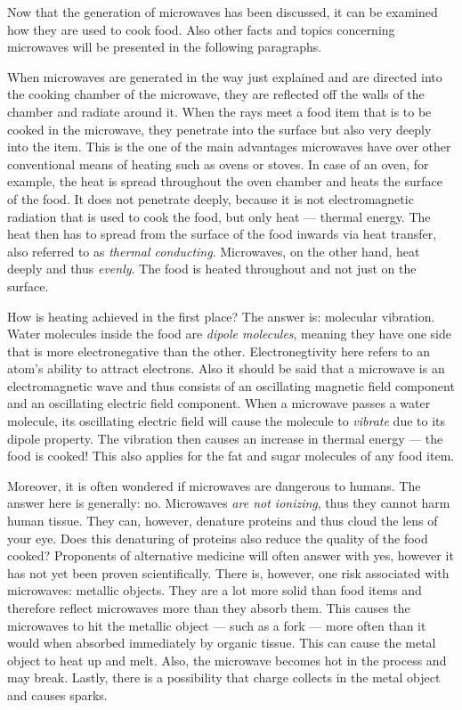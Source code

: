 
Now that the generation of microwaves has been discussed, it can be examined how they are used to cook food. Also other facts and topics concerning microwaves will be presented in the following paragraphs.

When microwaves are generated in the way just explained and are directed into the cooking chamber of the microwave, they are reflected off the walls of the chamber and radiate around it. When the rays meet a food item that is to be cooked in the microwave, they penetrate into the surface but also very deeply into the item. This is the one of the main advantages microwaves have over other conventional means of heating such as ovens or stoves. In case of an oven, for example, the heat is spread throughout the oven chamber and heats the surface of the food. It does not penetrate deeply, because it is not electromagnetic radiation that is used to cook the food, but only heat --- thermal energy. The heat then has to spread from the surface of the food inwards via heat transfer, also referred to as \emph{thermal conducting}. Microwaves, on the other hand, heat deeply and thus \emph{evenly}. The food is heated throughout and not just on the surface. 

How is heating achieved in the first place? The answer is: molecular vibration. Water molecules inside the food are \emph{dipole molecules}, meaning they have one side that is more electronegative than the other. Electronegtivity here refers to an atom's ability to attract electrons. Also it should be said that a microwave is an electromagnetic wave and thus consists of an oscillating magnetic field component and an oscillating electric field component. When a microwave passes a water molecule, its oscillating electric field will cause the molecule to \emph{vibrate} due to its dipole property. The vibration then causes an increase in thermal energy --- the food is cooked! This also applies for the fat and sugar molecules of any food item.

Moreover, it is often wondered if microwaves are dangerous to humans. The answer here is generally: no. Microwaves \emph{are not ionizing}, thus they cannot harm human tissue. They can, however, denature proteins and thus cloud the lens of your eye. Does this denaturing of proteins also reduce the quality of the food cooked? Proponents of alternative medicine will often answer with yes, however it has not yet been proven scientifically. There is, however, one risk associated with microwaves: metallic objects. They are a lot more solid than food items and therefore reflect microwaves more than they absorb them. This causes the microwaves to hit the metallic object --- such as a fork --- more often than it would when absorbed immediately by organic tissue. This can cause the metal object to heat up and melt. Also, the microwave becomes hot in the process and may break. Lastly, there is a possibility that charge collects in the metal object and causes sparks.

